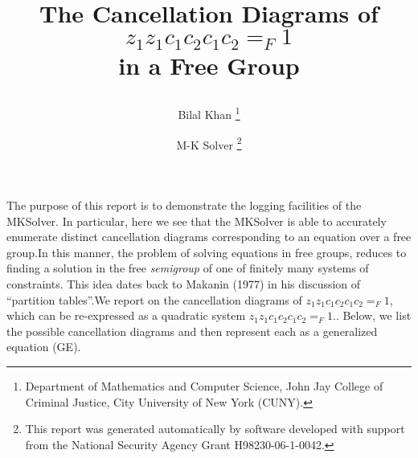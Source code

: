 \documentclass[final]{article}
\begin{document}
\date{}
\title{
  {\Large The Cancellation Diagrams of \\$z_{1}z_{1}c_{1}c_{2}c_{1}c_{2}=_F 1$\\ in a Free Group}
  {\normalsize
   \author{Bilal Khan
        \thanks{Department of Mathematics and Computer Science, John Jay College of Criminal Justice, City University of New York (CUNY).}
   \and M-K Solver
        \thanks{This report was generated automatically by software developed with support from the National Security Agency Grant H98230-06-1-0042.}
           }
  }
}

\maketitle

\setcounter{page}{2} 



The purpose of this report is to demonstrate the logging facilities of the MKSolver.  In particular, here we see that the MKSolver is able to accurately enumerate distinct cancellation diagrams corresponding to an equation over a free group.In this manner, the problem of solving equations in free groups, reduces to finding a solution in the free {\em semigroup} of one of finitely many systems of constraints.  This idea dates back to Makanin (1977) in his discussion of ``partition tables''.We report on the cancellation diagrams of $z_{1}z_{1}c_{1}c_{2}c_{1}c_{2}=_F 1$,
which can be re-expressed as a quadratic system $z_{1}z_{1}c_{1}c_{2}c_{1}c_{2}=_F 1.$.
Below, we list the possible cancellation diagrams and then represent each as a generalized equation (GE).

\newpage 
\end{document}
